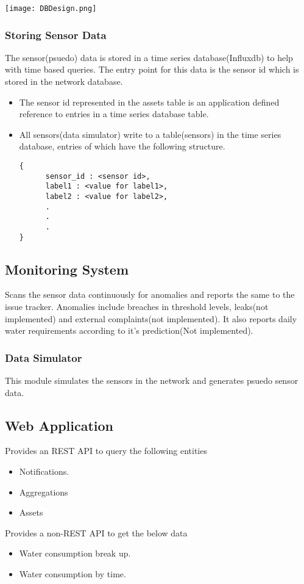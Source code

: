 \documentclass[11pt]{report} %
\begin{document}
\texttt{[image: DBDesign.png]}
\subsubsection{Storing Sensor Data}
The sensor(psuedo) data is stored in a time series database(Influxdb) to help with time based queries. The entry point for this data is the sensor id which is stored in the network database.
\begin{itemize}
\item The sensor id represented in the assets table is an application defined reference to entries in a time series database table.
\item All sensors(data simulator) write to a table(sensors) in the time series database,  entries of which have the following structure.
\begin{lstlisting}
{
      sensor_id : <sensor id>,
      label1 : <value for label1>,
      label2 : <value for label2>,
      .
      .
      .
}
\end{lstlisting}
\end{itemize}
\subsection{Monitoring System}
Scans the sensor data continuously for anomalies and reports the same to the issue tracker. Anomalies include breaches in threshold levels, leaks(not implemented) and external complaints(not implemented). It also reports daily water requirements according to it's prediction(Not implemented).
\subsubsection{Data Simulator}
This module simulates the sensors in the network and generates psuedo sensor data.
\subsection{Web Application}
\label{sec:web_application_api}
Provides an REST API to query  the following entities
\begin{itemize}
\item Notifications.
\item Aggregations
\item Assets
\end{itemize}
Provides a non-REST API to get the below data
\begin{itemize}
\item Water consumption break up.
\item Water consumption by time.
\end{itemize}
\end{document}
